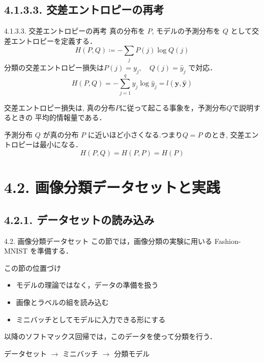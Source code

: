 \documentclass[dvipdfmx,uplatex,11pt]{beamer}
\begin{document}
\subsection{4.1.3.3. 交差エントロピーの再考}
\begin{frame}{4.1.3.3. 交差エントロピーの再考}
真の分布を $P$, モデルの予測分布を $Q$ として交差エントロピーを定義する．
\[
H(P,Q)
\coloneqq
-\sum_j P(j)\log Q(j)
\]
分類の交差エントロピー損失は$
P(j)=y_j,
\quad
Q(j)=\hat y_j
$
で対応．
\[
H(P,Q)
=
-\sum_{j=1}^{q}y_j\log\hat y_j
=
l(\bm y,\hat{\bm y})
\]
\begin{d2lplainbox}
交差エントロピー損失は,
真の分布$P$に従って起こる事象を，予測分布$Q$で説明するときの
平均的情報量である．
\end{d2lplainbox}
予測分布 $Q$ が真の分布 $P$ に近いほど小さくなる.つまり$Q=P$
のとき, 交差エントロピーは最小になる．
\[
H(P,Q)=H(P,P)=H(P)
\]
\end{frame}


\section{4.2. 画像分類データセットと実践}
\subsection{4.2.1. データセットの読み込み}
\begin{frame}{4.2. 画像分類データセット}
この節では，画像分類の実験に用いる
\alert{Fashion-MNIST} を準備する．

\begin{d2lbox}{この節の位置づけ}
\begin{itemize}
  \item モデルの理論ではなく，データの準備を扱う
  \item 画像とラベルの組を読み込む
  \item ミニバッチとしてモデルに入力できる形にする
\end{itemize}
\end{d2lbox}

以降のソフトマックス回帰では，このデータを使って分類を行う．

\centering
\large
データセット $\longrightarrow$ ミニバッチ $\longrightarrow$ 分類モデル
\end{frame}
\end{document}
